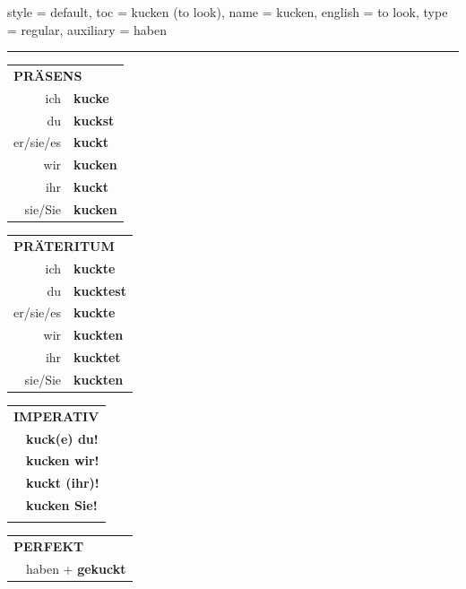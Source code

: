 \begin{verbentry}{
  style = {default},
  toc = {kucken (to look)},
  name = {kucken},
  english = {to look},
  type = {regular},
  auxiliary = {haben}
}
 
    
     \vspace{5pt}

    \hrule
    
    \vspace{5pt}

  \begin{tabular}{rl}
     \multicolumn{2}{l}{\textbf{PRÄSENS} }\\
    ich & \textbf{kucke}\\
    du & \textbf{kuckst}\\
    er/sie/es & \textbf{kuckt}\\
    wir & \textbf{kucken}\\
    ihr & \textbf{kuckt}\\
    sie/Sie & \textbf{kucken}\\
  \end{tabular}
  \hfill
     \begin{tabular}{rl}
    \multicolumn{2}{l}{\textbf{PRÄTERITUM} }\\
    ich & \textbf{kuckte}\\
    du & \textbf{kucktest}\\
    er/sie/es & \textbf{kuckte}\\
    wir & \textbf{kuckten}\\
    ihr & \textbf{kucktet}\\
    sie/Sie & \textbf{kuckten}\\
  \end{tabular}
  \hfill
  \begin{tabular}{rl}
     \multicolumn{2}{l}{\textbf{IMPERATIV} }\\
   & \textbf{kuck(e) du!}\\
   & \textbf{kucken wir!}\\
   & \textbf{kuckt (ihr)!}\\
   & \textbf{kucken Sie!}\\
   & \vspace{10pt}
  \end{tabular}

    \vspace{10pt}

 \begin{tabular}{rl}
     \multicolumn{2}{l}{\textbf{PERFEKT}}\\
   & haben + \textbf{gekuckt}\\
  \end{tabular}
\hfill
   \begin{tabular}{rl}
   

\end{tabular}
\end{verbentry}
